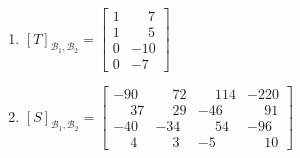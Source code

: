 \documentclass[12pt]{exam}
\begin{document}
\begin{exercicio}
\begin{solucao}
\begin{enumerate}[label={\alph*})]
            \item $[T]_{\mathcal{B}_1, \mathcal{B}_2} = \begin{bmatrix}
                1 & \phantom{-}7\\
                1 & \phantom{-}5\\
                0 & -10\\
                0 & -7
            \end{bmatrix}$

            \item $[S]_{\mathcal{B}_1, \mathcal{B}_2} = \begin{bmatrix}
                -90 & \phantom{-}72 & \phantom{-}114 & -220\\
                \phantom{-}37 & \phantom{-}29 & -46 & \phantom{-}91\\
                -40 & -34 & \phantom{-}54 & -96\\
                \phantom{-}4 & \phantom{-}3 & -5 & \phantom{-}10
            \end{bmatrix}$
        \end{enumerate}
    \end{solucao}
\end{exercicio}
\end{document}
